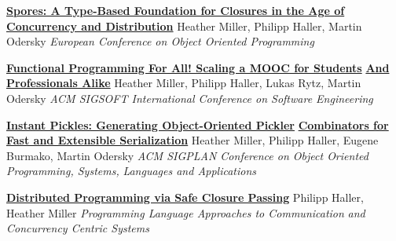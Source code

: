 \documentclass[9pt]{article}
\begin{document}
\noindent\href{http://infoscience.epfl.ch/record/191239}{\bf Spores: A Type-Based Foundation for Closures in the Age of}\vspace{-0.03in}
\newline\noindent\href{http://infoscience.epfl.ch/record/191239}{\bf Concurrency and Distribution}
\newline\noindent Heather Miller, Philipp Haller, Martin Odersky
\newline\noindent\emph{European Conference on Object Oriented Programming}
\bigskip

\noindent\href{http://infoscience.epfl.ch/record/190022}{\bf Functional Programming For All! Scaling a MOOC for Students}\vspace{-0.03in}
\newline\noindent\href{http://infoscience.epfl.ch/record/190022}{\bf And Professionals Alike}
\newline\noindent Heather Miller, Philipp Haller, Lukas Rytz, Martin Odersky
\newline\noindent\emph{ACM SIGSOFT International Conference on Software Engineering}
\bigskip

\noindent\href{http://infoscience.epfl.ch/record/188383}{\bf Instant Pickles: Generating Object-Oriented Pickler}\vspace{-0.03in}
\newline\noindent\href{http://infoscience.epfl.ch/record/188383}{\bf Combinators for Fast and Extensible Serialization}
\newline\noindent Heather Miller, Philipp Haller, Eugene Burmako, Martin Odersky
\newline\noindent\emph{ACM SIGPLAN Conference on Object Oriented Programming, Systems,}
\newline\noindent\emph{Languages and Applications}
\bigskip


\noindent\href{https://infoscience.epfl.ch/record/205039}{\bf Distributed Programming via Safe Closure Passing}
\newline\noindent Philipp Haller, Heather Miller
\newline\noindent\emph{Programming Language Approaches to Communication}
\newline\noindent\emph{and Concurrency Centric Systems}
\bigskip
\end{document}
